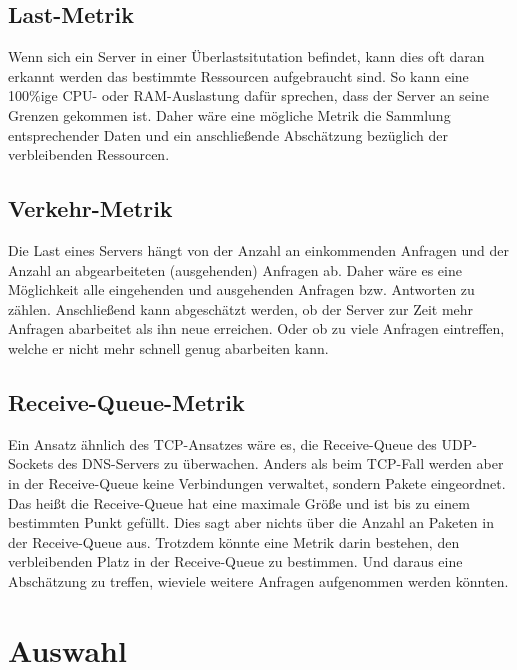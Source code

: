 \documentclass[a4paper, 12pt, BCOR10mm, DIV12, toc=bibliography, toc=listof, german]{scrbook}
\begin{document}
		\subsection*{Last-Metrik} %

		Wenn sich ein Server in einer Überlastsitutation befindet, kann dies oft daran erkannt werden
		das bestimmte Ressourcen aufgebraucht sind. So kann eine 100\%ige CPU- oder RAM-Auslastung dafür
		sprechen, dass der Server an seine Grenzen gekommen ist. Daher wäre eine mögliche Metrik die
		Sammlung entsprechender Daten und ein anschließende Abschätzung bezüglich der verbleibenden
		Ressourcen.
		

		\subsection*{Verkehr-Metrik} %

		Die Last eines Servers hängt von der Anzahl an einkommenden Anfragen und der Anzahl an
		abgearbeiteten (ausgehenden) Anfragen ab. Daher wäre es eine Möglichkeit alle eingehenden und
		ausgehenden Anfragen bzw. Antworten zu zählen. Anschließend kann abgeschätzt werden, ob der
		Server zur Zeit mehr Anfragen abarbeitet als ihn neue erreichen. Oder ob zu viele Anfragen
		eintreffen, welche er nicht mehr schnell genug abarbeiten kann.
		

		\subsection*{Receive-Queue-Metrik} %

		Ein Ansatz ähnlich des TCP-Ansatzes wäre es, die Receive-Queue des UDP-Sockets des DNS-Servers zu
		überwachen. Anders als beim TCP-Fall werden aber in der Receive-Queue keine Verbindungen
		verwaltet, sondern Pakete eingeordnet. Das heißt die Receive-Queue hat eine maximale Größe und
		ist bis zu einem bestimmten Punkt gefüllt. Dies sagt aber nichts über die Anzahl an Paketen in
		der Receive-Queue aus. Trotzdem könnte eine Metrik darin bestehen, den verbleibenden Platz in
		der Receive-Queue zu bestimmen. Und daraus eine Abschätzung zu treffen, wieviele weitere
		Anfragen aufgenommen werden könnten.

		

		\section{Auswahl} %
		\label{sec:auswahl}
\end{document}
